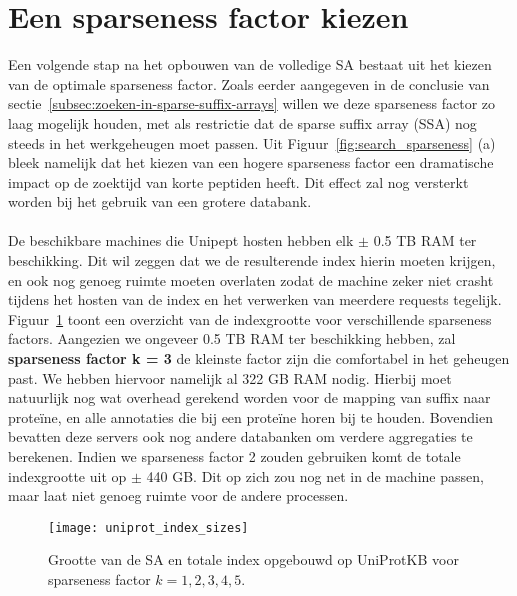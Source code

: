 \section{Een sparseness factor kiezen}
Een volgende stap na het opbouwen van de volledige SA bestaat uit het kiezen van de optimale sparseness factor.
Zoals eerder aangegeven in de conclusie van sectie~\ref{subsec:zoeken-in-sparse-suffix-arrays} willen we deze sparseness factor zo laag mogelijk houden, met als restrictie dat de sparse suffix array (SSA) nog steeds in het werkgeheugen moet passen.
Uit Figuur~\ref{fig:search_sparseness} (a) bleek namelijk dat het kiezen van een hogere sparseness factor een dramatische impact op de zoektijd van korte peptiden heeft.
Dit effect zal nog versterkt worden bij het gebruik van een grotere databank.
\\ \\
De beschikbare machines die Unipept hosten hebben elk $\pm$ 0.5 TB RAM ter beschikking.
Dit wil zeggen dat we de resulterende index hierin moeten krijgen, en ook nog genoeg ruimte moeten overlaten zodat de machine zeker niet crasht tijdens het hosten van de index en het verwerken van meerdere requests tegelijk.
Figuur~\ref{fig:uniprot_index_size_sparsenessfactors} toont een overzicht van de indexgrootte voor verschillende sparseness factors.
Aangezien we ongeveer 0.5 TB RAM ter beschikking hebben, zal \textbf{sparseness factor k = 3} de kleinste factor zijn die comfortabel in het geheugen past.
We hebben hiervoor namelijk al 322 GB RAM nodig.
Hierbij moet natuurlijk nog wat overhead gerekend worden voor de mapping van suffix naar proteïne, en alle annotaties die bij een proteïne horen bij te houden.
Bovendien bevatten deze servers ook nog andere databanken om verdere aggregaties te berekenen.
Indien we sparseness factor 2 zouden gebruiken komt de totale indexgrootte uit op $\pm$ 440 GB\@.
Dit op zich zou nog net in de machine passen, maar laat niet genoeg ruimte voor de andere processen.

\begin{figure}[h!]
    \centering
    \texttt{[image: uniprot\_index\_sizes]}
    \caption{Grootte van de SA en totale index opgebouwd op UniProtKB voor sparseness factor $k = 1, 2, 3, 4, 5$.}
    \label{fig:uniprot_index_size_sparsenessfactors}
\end{figure}

